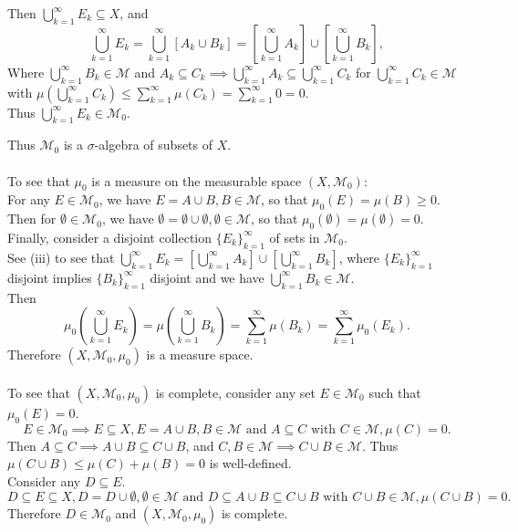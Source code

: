 \begin{enumerate}
\begin{enumerate}[label=(\roman*),align=left]
		Then $\bigcup_{k=1}^\infty E_k\subseteq X$, and 
		\[
			\bigcup_{k=1}^\infty E_k=\bigcup_{k=1}^\infty [A_k\cup B_k]=[\bigcup_{k=1}^\infty A_k]\cup[\bigcup_{k=1}^\infty B_k],
		\]
		Where $\bigcup_{k=1}^\infty B_k\in\mathcal{M}$ and $A_k\subseteq C_k\implies\bigcup_{k=1}^\infty A_k\subseteq \bigcup_{k=1}^\infty C_k$ for $\bigcup_{k=1}^\infty C_k\in\mathcal{M}$ with $\mu(\bigcup_{k=1}^\infty C_k)\le\sum_{k=1}^\infty\mu(C_k)=\sum_{k=1}^\infty0=0$.
		\\Thus $\bigcup_{k=1}^\infty E_k\in\mathcal{M}_0$.
	\end{enumerate}
	Thus $\mathcal{M}_0$ is a $\sigma$-algebra of subsets of $X$.\\
	\\To see that $\mu_0$ is a measure on the measurable space $(X,\mathcal{M}_0)$:
	\\For any $E\in\mathcal{M}_0$, we have $E=A\cup B,B\in\mathcal{M}$, so that $\mu_0(E)=\mu(B)\ge0$.
	\\Then for $\emptyset\in\mathcal{M}_0$, we have $\emptyset=\emptyset\cup \emptyset,\emptyset\in\mathcal{M}$, so that $\mu_0(\emptyset)=\mu(\emptyset)=0$.
	\\Finally, consider a disjoint collection $\{E_k\}_{k=1}^\infty$ of sets in $\mathcal{M}_0$.
	\\See (iii) to see that $\bigcup_{k=1}^\infty E_k=[\bigcup_{k=1}^\infty A_k]\cup[\bigcup_{k=1}^\infty B_k]$, where $\{E_k\}_{k=1}^\infty$ disjoint implies $\{B_k\}_{k=1}^\infty$ disjoint and we have $\bigcup_{k=1}^\infty B_k\in\mathcal{M}$.
	\\Then 
	\[
		\mu_0(\bigcup_{k=1}^\infty E_k)=\mu(\bigcup_{k=1}^\infty B_k)=\sum_{k=1}^\infty\mu(B_k)=\sum_{k=1}^\infty\mu_0(E_k).
	\]
	Therefore $(X,\mathcal{M}_0,\mu_0)$ is a measure space.\\
	\\To see that $(X,\mathcal{M}_0,\mu_0)$ is complete, consider any set $E\in\mathcal{M}_0$ such that $\mu_0(E)=0$.
	\[
		E\in\mathcal{M}_0\implies E\subseteq X,E=A\cup B, B\in\mathcal{M}\text{ and }A\subseteq C\text{ with }C\in\mathcal{M}, \mu(C)=0.
	\]
	Then $A\subseteq C\implies A\cup B\subseteq C\cup B$, and $C,B\in\mathcal{M}\implies C\cup B\in\mathcal{M}$.
	Thus $\mu(C\cup B)\le \mu(C)+\mu(B)=0$ is well-defined.
	\\Consider any $D\subseteq E$.
	\[
		D\subseteq E\subseteq X,D=D\cup \emptyset, \emptyset\in\mathcal{M}\text{ and }D\subseteq A\cup B\subseteq C\cup B\text{ with }C\cup B\in\mathcal{M}, \mu(C\cup B)=0.
	\]
	Therefore $D\in \mathcal{M}_0$ and $(X,\mathcal{M}_0,\mu_0)$ is complete.

\end{enumerate}
